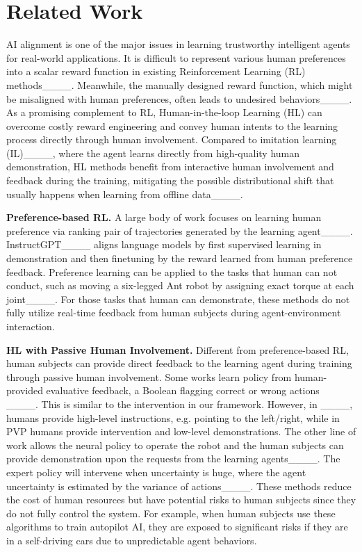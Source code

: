 \section{Related Work}
AI alignment is one of the major issues in learning trustworthy intelligent agents for real-world applications. It is difficult to represent various human preferences into a scalar reward function in existing Reinforcement Learning (RL) methods____. Meanwhile, the manually designed reward function, which might be misaligned with human preferences, often leads to undesired behaviors____.
As a promising complement to RL, Human-in-the-loop Learning (HL) can overcome costly reward engineering and convey human intents to the learning process directly through human involvement.
Compared to imitation learning (IL)____, where the agent learns directly from high-quality human demonstration, HL methods benefit from interactive human involvement and feedback during the training, mitigating the possible distributional shift that usually happens when learning from offline data____.


\textbf{Preference-based RL.}
A large body of work focuses on learning human preference via ranking pair of trajectories generated by the learning agent____.
InstructGPT____ aligns language models by first supervised learning in demonstration and then finetuning by the reward learned from human preference feedback.
Preference learning can be applied to the tasks that human can not conduct, such as moving a six-legged Ant robot by assigning exact torque at each joint____.
For those tasks that human can demonstrate, these methods do not fully utilize real-time feedback from human subjects during agent-environment interaction.


\textbf{HL with Passive Human Involvement.}
Different from preference-based RL, human subjects can provide direct feedback to the learning agent during training through passive human involvement.
Some works learn policy from human-provided evaluative feedback, a Boolean flagging correct or wrong actions~
____. This is similar to the intervention in our framework. 
However, in ____, humans provide high-level instructions, e.g. pointing to the left/right, while in PVP humans provide intervention and low-level demonstrations.
The other line of work allows the neural policy to operate the robot and the human subjects can provide demonstration upon the requests from the learning agents____.
The expert policy will intervene when uncertainty is huge, where the agent uncertainty is estimated by the variance of actions____.
These methods reduce the cost of human resources but have potential risks to human subjects since they do not fully control the system.
For example, when human subjects use these algorithms to train autopilot AI, they are exposed to significant risks if they are in a self-driving cars due to unpredictable agent behaviors.


